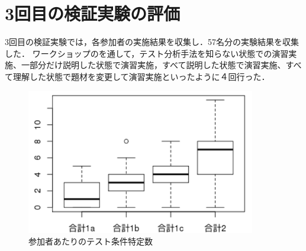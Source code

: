\documentclass[a4paper,12pt]{jreport}
\begin{document}
\section{3回目の検証実験の評価}
3回目の検証実験では，各参加者の実施結果を収集し．57名分の実験結果を収集した．
ワークショップのを通して，テスト分析手法を知らない状態での演習実施、一部分だけ説明した状態で演習実施，すべて説明した状態で演習実施、すべて理解した状態で題材を変更して演習実施といったように４回行った．
\begin{figure}[h]
  \begin{center}
  \includegraphics[width=10cm]{./image/D-3-Fig10.png}
  \caption{参加者あたりのテスト条件特定数}
  \label{fig:D-3-Fig10}
  \end{center}
   \end{figure}
\end{document}
